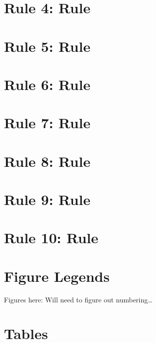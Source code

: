 \documentclass[10pt,letterpaper]{article}
\begin{document}
\section*{Rule 4: Rule}\label{rule-4-rule}

\section*{Rule 5: Rule}\label{rule-5-rule}

\section*{Rule 6: Rule}\label{rule-6-rule}

\section*{Rule 7: Rule}\label{rule-7-rule}

\section*{Rule 8: Rule}\label{rule-8-rule}

\section*{Rule 9: Rule}\label{rule-9-rule}

\section*{Rule 10: Rule}\label{rule-10-rule}

\section*{Figure Legends}\label{figure-legends}

Figures here: Will need to figure out numbering\ldots{}

\section*{Tables}\label{tables}
\end{document}
